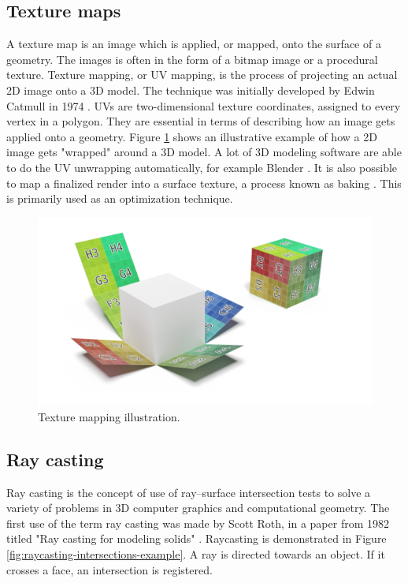 \subsection{Texture maps}
A texture map is an image which is applied, or mapped, onto the surface of a geometry. The images is often in the form of a bitmap image or a procedural texture. Texture mapping, or UV mapping, is the process of projecting an actual 2D image onto a 3D model. The technique was initially developed by Edwin Catmull in 1974 \cite{catmull-texture-mapping}. UVs are two-dimensional texture coordinates, assigned to every vertex in a polygon. They are essential in terms of describing how an image gets applied onto a geometry. Figure \ref{fig:texture-mapping} shows an illustrative example of how a 2D image gets "wrapped" around a 3D model. A lot of 3D modeling software are able to do the UV unwrapping automatically, for example Blender \cite{blender}. It is also possible to map a finalized render into a surface texture, a process known as baking \cite{blender-texture-baking}. This is primarily used as an optimization technique.

\begin{figure}[h]
    \centering
    \includegraphics[width=\textwidth]{sections/theory/figures/texture-mapping.png}
    \caption{Texture mapping illustration.}
    \label{fig:texture-mapping}
\end{figure}

\subsection{Ray casting}
Ray casting is the concept of use of ray–surface intersection tests to solve a variety of problems in 3D computer graphics and computational geometry. 
The first use of the term ray casting was made by Scott Roth, in a paper from 1982 titled "Ray casting for modeling solids" \cite{roth-ray-casting}. Raycasting is demonstrated in Figure \ref{fig:raycasting-intersections-example}. A ray is directed towards an object. If it crosses a face, an intersection is registered.


